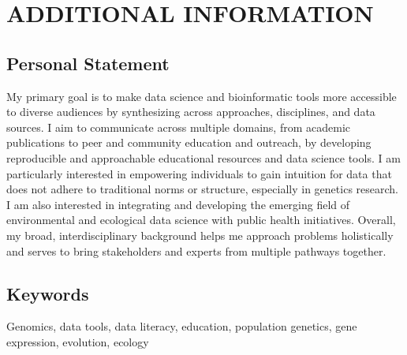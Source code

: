 \documentclass{cv}
\begin{document}

\section*{ADDITIONAL INFORMATION}

\subsection*{Personal Statement}

My primary goal is to make data science and bioinformatic tools more accessible to diverse audiences by synthesizing across approaches, disciplines, and data sources. I aim to communicate across multiple domains, from academic publications to peer and community education and outreach, by developing reproducible and approachable educational resources and data science tools. I am particularly interested in empowering individuals to gain intuition for data that does not adhere to traditional norms or structure, especially in genetics research. I am also interested in integrating and developing the emerging field of environmental and ecological data science with public health initiatives. Overall, my broad, interdisciplinary background helps me approach problems holistically and serves to bring stakeholders and experts from multiple pathways together.

\subsection*{Keywords}

Genomics, data tools, data literacy, education, population genetics, gene expression, evolution, ecology
\end{document}
